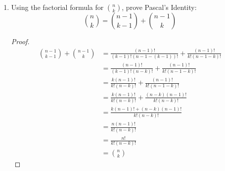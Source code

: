 \documentclass[12pt]{article}
\begin{document}
\begin{enumerate}
		\begin{proof}
			\begin{enumerate}
				\item Factorial Formula\\
				\begin{align*}
					n {n-1 \choose k-1} &= n\cdot  \Big( \frac{(n-1)!}{(k-1)!(n-1-(k-1))!} \Big)\\
					&= \frac{n!}{(k-1)!(n-k)!}\\
					&= \frac{k\cdot n!}{k!(n-k)!}\\
					&= k \cdot \Big( \frac{ n!}{k!(n-k)!} \Big)\\
					&=k {n \choose k}
				\end{align*}
			\item Combinatorial proof\\
		Questions: There are $n$ elements in the set with no label, and we need to select $k-1$ elements from it and label it "B" and one element and label it "A". Assuming each element can have one label and later one will override the former one, how many ways can we do it?\\
		Left: First, labeling $k$ "B" from $n$ elements, we will have ${n \choose k}$ ways to do it. Then, label one "A" from $k$ elements, we will have ${k \choose 1}$ way to do it. Together, there are ${k \choose 1}\cdot {n \choose k} = k {n \choose k}$ ways.\\
		Right: We first label one "A" from the $n$ elements set. There are ${n \choose 1} = n$ ways. Then, in the $n-1$ elements, we need to select $k-1$ elements and label it with "B". It can be represented as $ {n-1\choose k-1}$. Therefore, there are $n{n-1\choose k-1}$ ways to label.\\
		Since both solutions answer the question correctly, $k {n \choose k} = n{n-1\choose k-1}$.
		
			\end{enumerate}
		\end{proof}
		\item Using the factorial formula for ${n\choose k}$, prove Pascal's Identity:
		\[{n\choose k} = {n-1\choose k-1} + {n-1\choose k}\]
		\begin{proof}
			\begin{align*}
				{n-1\choose k-1} + {n-1\choose k} &= \frac{(n-1)!}{(k-1)!(n-1-(k-1))!} + \frac{(n-1)!}{k!(n-1-k)!}\\
				&= \frac{(n-1)!}{(k-1)!(n-k)!} + \frac{(n-1)!}{k!(n-1-k)!}\\
				&=  \frac{k(n-1)!}{k!(n-k)!} + \frac{(n-1)!}{k!(n-1-k)!}\\
				&=  \frac{k(n-1)!}{k!(n-k)!} + \frac{(n-k)(n-1)!}{k!(n-k)!}\\
				&= \frac{k(n-1)! + (n-k)(n-1)!}{k!(n-k)!}\\
				&= \frac{n(n-1)!}{k!(n-k)!}\\
				&= \frac{n!}{k!(n-k)!}\\
				& = {n\choose k}
			\end{align*}
		\end{proof}
		
	\end{enumerate}
\end{document}
